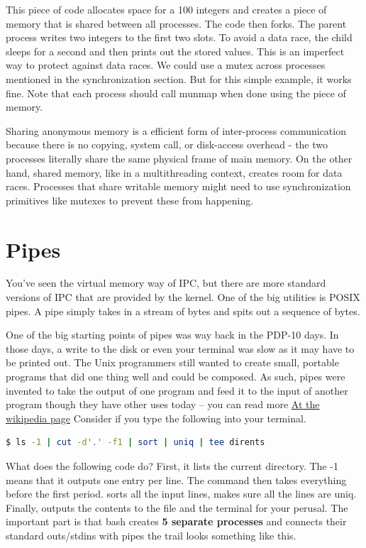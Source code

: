 This piece of code allocates space for a 100 integers and creates a piece of memory that is shared between all processes.
The code then forks.
The parent process writes two integers to the first two slots.
To avoid a data race, the child sleeps for a second and then prints out the stored values.
This is an imperfect way to protect against data races.
We could use a mutex across processes mentioned in the synchronization section.
But for this simple example, it works fine.
Note that each process should call munmap when done using the piece of memory.

Sharing anonymous memory is a efficient form of inter-process communication because there is no copying, system call, or disk-access overhead - the two processes literally share the same physical frame of main memory.
On the other hand, shared memory, like in a multithreading context, creates room for data races.
Processes that share writable memory might need to use synchronization primitives like mutexes to prevent these from happening.

\section{Pipes}

You've seen the virtual memory way of IPC, but there are more standard versions of IPC that are provided by the kernel.
One of the big utilities is POSIX pipes.
A pipe simply takes in a stream of bytes and spits out a sequence of bytes.

One of the big starting points of pipes was way back in the PDP-10 days. In those days, a write to the disk or even your terminal was slow as it may have to be printed out.
The Unix programmers still wanted to create small, portable programs that did one thing well and could be composed.
As such, pipes were invented to take the output of one program
and feed it to the input of another program though they have other uses today -- you can read more \href{https://en.wikipedia.org/wiki/Pipeline\_\%28Unix\%29}{At the wikipedia page}
Consider if you type the following into your terminal.

\begin{lstlisting}[language=bash]
$ ls -1 | cut -d'.' -f1 | sort | uniq | tee dirents
\end{lstlisting}

What does the following code do?
First, it lists the current directory.
The -1 means that it outputs one entry per line.
The  command then takes everything before the first period.
 sorts all the input lines,  makes sure all the lines are uniq.
Finally,  outputs the contents to the file  and the terminal for your perusal.
The important part is that bash creates \textbf{5 separate processes} and connects their standard outs/stdins with pipes the trail looks something like this.

